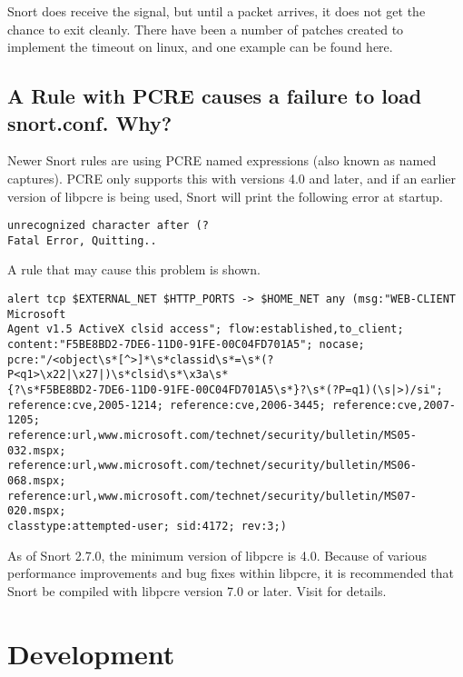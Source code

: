 \documentclass{article}
\begin{document}
Snort does receive the signal, but until a packet arrives, it does
not get the chance to exit cleanly.  There have been a number of
patches created to implement the timeout on linux, and one example
can be found here.


\subsection{A Rule with PCRE causes a failure to load snort.conf.  Why?}

Newer Snort rules are using PCRE named expressions (also known as
named captures).  PCRE only supports this with versions 4.0 and
later, and if an earlier version of libpcre is being used, Snort will
print the following error at startup.

\begin{verbatim}
unrecognized character after (?
Fatal Error, Quitting..
\end{verbatim}

A rule that may cause this problem is shown.

\begin{verbatim}
alert tcp $EXTERNAL_NET $HTTP_PORTS -> $HOME_NET any (msg:"WEB-CLIENT Microsoft
Agent v1.5 ActiveX clsid access"; flow:established,to_client;
content:"F5BE8BD2-7DE6-11D0-91FE-00C04FD701A5"; nocase;
pcre:"/<object\s*[^>]*\s*classid\s*=\s*(?P<q1>\x22|\x27|)\s*clsid\s*\x3a\s*
{?\s*F5BE8BD2-7DE6-11D0-91FE-00C04FD701A5\s*}?\s*(?P=q1)(\s|>)/si";
reference:cve,2005-1214; reference:cve,2006-3445; reference:cve,2007-1205;
reference:url,www.microsoft.com/technet/security/bulletin/MS05-032.mspx;
reference:url,www.microsoft.com/technet/security/bulletin/MS06-068.mspx;
reference:url,www.microsoft.com/technet/security/bulletin/MS07-020.mspx;
classtype:attempted-user; sid:4172; rev:3;)
\end{verbatim}

As of Snort 2.7.0, the minimum version of libpcre is 4.0.  Because of
various performance improvements and bug fixes within libpcre, it is
recommended that Snort be compiled with libpcre version 7.0 or later.
Visit  for
details.

\section{Development}   
  
\end{document}
